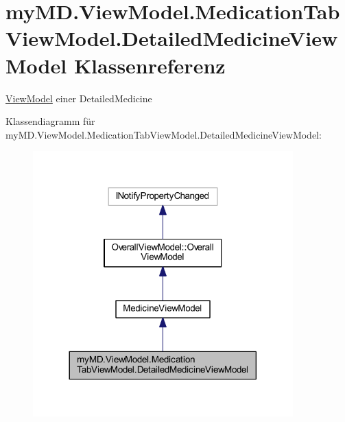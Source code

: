 \hypertarget{classmy_m_d_1_1_view_model_1_1_medication_tab_view_model_1_1_detailed_medicine_view_model}{}\section{my\+M\+D.\+View\+Model.\+Medication\+Tab\+View\+Model.\+Detailed\+Medicine\+View\+Model Klassenreferenz}
\label{classmy_m_d_1_1_view_model_1_1_medication_tab_view_model_1_1_detailed_medicine_view_model}


\mbox{\hyperlink{namespacemy_m_d_1_1_view_model}{View\+Model}} einer Detailed\+Medicine  




Klassendiagramm für my\+M\+D.\+View\+Model.\+Medication\+Tab\+View\+Model.\+Detailed\+Medicine\+View\+Model\+:\nopagebreak
\begin{figure}[H]
\begin{center}
\leavevmode
\includegraphics[width=284pt]{classmy_m_d_1_1_view_model_1_1_medication_tab_view_model_1_1_detailed_medicine_view_model__inherit__graph}
\end{center}
\end{figure}


